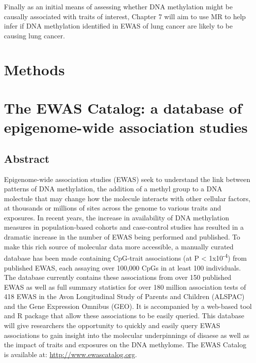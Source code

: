 \documentclass[11pt,twoside]{bristolthesis}
\begin{document}
Finally as an initial means of assessing whether DNA methylation might be causally associated with traits of interest, Chapter 7 will aim to use MR to help infer if DNA methylation identified in EWAS of lung cancer are likely to be causing lung cancer.

\hypertarget{methods}{%
\chapter{Methods}\label{methods}}

\hypertarget{ewas-catalog}{%
\chapter{The EWAS Catalog: a database of epigenome-wide association studies}\label{ewas-catalog}}

\hypertarget{abstract}{%
\section{Abstract}\label{abstract}}

Epigenome-wide association studies (EWAS) seek to understand the link between patterns of DNA methylation, the addition of a methyl group to a DNA molectule that may change how the molecule interacts with other cellular factors, at thousands or millions of sites across the genome to various traits and exposures. In recent years, the increase in availability of DNA methylation measures in population-based cohorts and case-control studies has resulted in a dramatic increase in the number of EWAS being performed and published. To make this rich source of molecular data more accessible, a manually curated database has been made containing CpG-trait associations (at P \textless{} 1x10\textsuperscript{-4}) from published EWAS, each assaying over 100,000 CpGs in at least 100 individuals. The database currently contains these associations from over 150 published EWAS as well as full summary statistics for over 180 million association tests of 418 EWAS in the Avon Longitudinal Study of Parents and Children (ALSPAC) and the Gene Expression Omnibus (GEO). It is accompanied by a web-based tool and R package that allow these associations to be easily queried. This database will give researchers the opportunity to quickly and easily query EWAS associations to gain insight into the molecular underpinnings of disaese as well as the impact of traits and exposures on the DNA methylome. The EWAS Catalog is available at: \url{http://www.ewascatalog.org}.
\end{document}
